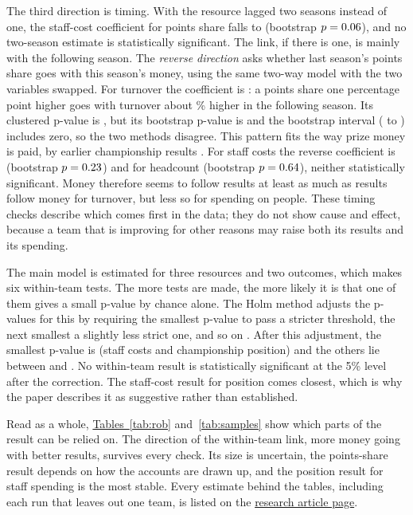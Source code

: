 \documentclass[11pt,a4paper]{article}
\newcommand{\site}{https://nahianibnat-2000.github.io/F1-moneyball}
\newcommand{\sitepage}[2]{\href{\site/#1}{#2}}
\begin{document}
The third direction is timing. With the resource lagged two seasons instead of one, the staff-cost coefficient for points
share falls to \LagTwoStaff{} (bootstrap $p = 0.06$), and no two-season estimate is statistically
significant. The link, if there is one, is mainly with the following season. The \textit{reverse direction} asks whether
last season's points share goes with this season's money, using the same two-way model with the two variables swapped.
For turnover the coefficient is \RevTurn: a points share one percentage point higher goes with turnover about
\RevPerPpTurn\% higher in the following season. Its clustered p-value is \RevPTurn, but its bootstrap p-value is
\RevPwildTurn{} and the bootstrap interval (\RevCiLowTurn{} to \RevCiHighTurn) includes zero, so the two methods disagree.
This pattern fits the way prize money is paid, by earlier championship results \citep{liberty2018}. For staff costs the
reverse coefficient is \RevStaff{} (bootstrap $p = 0.23$) and for headcount \RevHead{} (bootstrap
$p = 0.64$), neither statistically significant. Money therefore seems to follow results at least as much as
results follow money for turnover, but less so for spending on people. These timing checks describe which comes first in
the data; they do not show cause and effect, because a team that is improving for other reasons may raise both its
results and its spending.

The main model is estimated for three resources and two outcomes, which makes six
within-team tests. The more tests are made, the more likely it is that one of them gives a small p-value by chance alone.
The Holm method adjusts the p-values for this by requiring the smallest p-value to pass a stricter threshold, the next
smallest a slightly less strict one, and so on \citep{holm1979}. After this adjustment, the smallest p-value is
\HolmPosStaff{} (staff costs and championship position) and the others lie between \HolmRestMin{} and \HolmRestMax. No
within-team result is statistically significant at the 5\% level after the correction. The staff-cost result for position
comes closest, which is why the paper describes it as suggestive rather than established.

Read as a whole, \hyperref[tab:rob]{Tables~\ref*{tab:rob}} and~\hyperref[tab:samples]{\ref*{tab:samples}} show which
parts of the result can be relied on. The direction of the within-team link, more money going with better results, survives every
check. Its size is uncertain, the points-share result depends on how the accounts are drawn up, and the position result for
staff spending is the most stable. Every estimate behind the tables, including each run that leaves out one team, is listed
on the \sitepage{research/does-money-buy-speed}{research article page}.
\end{document}
